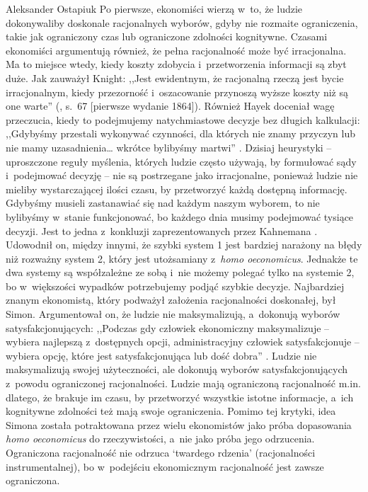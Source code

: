 \begin{artplenv}{Aleksander Ostapiuk}
Po pierwsze, ekonomiści wierzą w~to, że ludzie dokonywaliby doskonale racjonalnych wyborów, gdyby nie rozmaite
ograniczenia, takie jak ograniczony czas lub ograniczone zdolności kognitywne. Czasami ekonomiści argumentują również,
że pełna racjonalność może być irracjonalna. Ma to miejsce wtedy, kiedy koszty zdobycia i~przetworzenia informacji są
zbyt duże. Jak zauważył \mbox{Knight}: ,,Jest ewidentnym, że racjonalną rzeczą jest bycie irracjonalnym, kiedy
przezorność i~oszacowanie przynoszą wyższe koszty niż są one warte''
(\cite{knight_risk_1921}, s.~67 [pierwsze wydanie 1864]).
Również Hayek doceniał wagę przeczucia, kiedy to podejmujemy natychmiastowe decyzje bez długich
kalkulacji: ,,Gdybyśmy przestali wykonywać czynności, dla których nie znamy przyczyn lub nie mamy uzasadnienia… wkrótce
bylibyśmy martwi''
\parencite[s.~68]{hayek_fatal_1988}.
Dzisiaj heurystyki -- uproszczone reguły myślenia,
których ludzie często używają, by formułować sądy i~podejmować decyzję -- nie są postrzegane jako irracjonalne, ponieważ
ludzie nie mieliby wystarczającej ilości czasu, by przetworzyć każdą dostępną informację. Gdybyśmy musieli zastanawiać
się nad każdym naszym wyborem, to nie bylibyśmy w~stanie funkcjonować, bo każdego dnia musimy podejmować tysiące
decyzji. Jest to jedna z~konkluzji zaprezentowanych przez Kahnemana
\parencite*{kahneman_pulapki_2012}.
Udowodnił on,
między innymi, że szybki system 1 jest bardziej narażony na błędy niż rozważny system 2, który jest
utożsamiany z~\textit{homo oeconomicus}. Jednakże te dwa systemy są współzależne ze sobą i~nie możemy
polegać tylko na systemie 2, bo
w~większości wypadków potrzebujemy podjąć szybkie decyzje. Najbardziej znanym ekonomistą, który podważył założenia
racjonalności doskonałej, był Simon. Argumentował on, że ludzie nie maksymalizują, a~dokonują wyborów
satysfakcjonujących: ,,Podczas gdy człowiek ekonomiczny maksymalizuje -- wybiera najlepszą z~dostępnych opcji,
administracyjny człowiek satysfakcjonuje -- wybiera opcję, które jest satysfakcjonująca lub dość dobra''
\parencite[s.~XXIX]{simon_administrative_1947}.
Ludzie nie maksymalizują swojej użyteczności, ale dokonują wyborów
satysfakcjonujących z~powodu ograniczonej racjonalności. Ludzie mają ograniczoną racjonalność m.in. dlatego, że
brakuje im czasu, by przetworzyć wszystkie istotne informacje, a~ich kognitywne zdolności też mają swoje ograniczenia.
Pomimo tej krytyki, idea Simona została potraktowana przez wielu ekonomistów jako próba dopasowania \textit{homo
oeconomicus} do rzeczywistości, a~nie jako próba jego odrzucenia. Ograniczona racjonalność nie odrzuca `twardego rdzenia'
(racjonalności instrumentalnej), bo w~podejściu ekonomicznym racjonalność jest zawsze ograniczona.


\end{artplenv}
